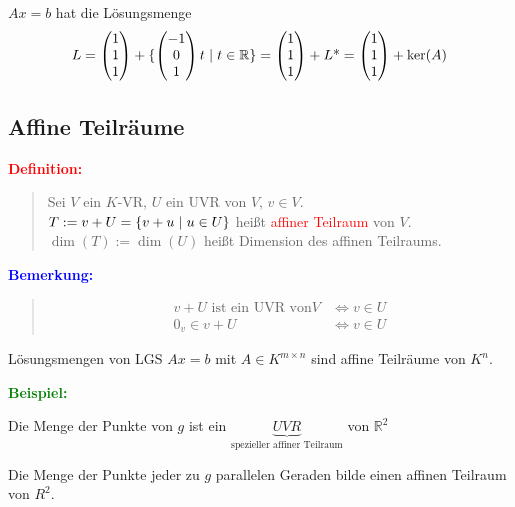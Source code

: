 \documentclass{article}
\newcommand{\smsp}{\phantom{\hspace{3px}}}
\newcommand{\red}[1]{\textcolor{red}{#1}}
\newcommand{\blue}[1]{\textcolor{blue}{#1}}
\newcommand{\green}[1]{\textcolor{green}{#1}}
\newcommand{\ex}{\green{\textbf{Beispiel: }}}
\newcommand{\de}[1]{\red{\textbf{Definition: }}\begin{quote}#1\end{quote}}
\newcommand{\an}[1]{\blue{\textbf{Bemerkung: }}\begin{quote}#1\end{quote}}
\newcommand{\R}{\mathbb{R}}
\renewcommand{\st}{\smsp | \smsp}
\newcommand{\vvvec}[3]{\begin{pmatrix}#1\\#2\\#3\end{pmatrix}}
\begin{document}
$Ax = b$ hat die Lösungsmenge
\[
    L = \vvvec{1}{1}{1} + \{\vvvec{-1}{0}{1} t \st t \in \R\} = \vvvec{1}{1}{1} + L\text{*} = \vvvec{1}{1}{1} + \ker(A)
\]

\subsection{Affine Teilräume}

\de{
    Sei $V$ ein $K$-VR, $U$ ein UVR von $V$, $v \in V$.\\
    $T := v + U = \{v + u \st u \in U\}$ heißt \red{affiner Teilraum} von $V$.\\
    $\dim(T) := \dim(U)$ heißt Dimension des affinen Teilraums.
}

\an{
    \vspace{-15px}
    \begin{align*}
        v + U \text{ ist ein UVR von} V &\iff v \in U\\
        0_v \in v + U &\iff v \in U
    \end{align*}    
}
Lösungsmengen von LGS $Ax = b$ mit $A \in K^{m \times n}$ sind affine Teilräume von $K^n$.

\ex\\
\begin{minipage}{5cm}
\end{minipage}
\begin{minipage}{5cm}
    Die Menge der Punkte von $g$ ist ein $\underbrace{UVR}_{\text{spezieller affiner Teilraum}}$ von $\R^2$

    Die Menge der Punkte jeder zu $g$ parallelen Geraden bilde einen affinen Teilraum von $R^2$.
\end{minipage}
\end{document}
